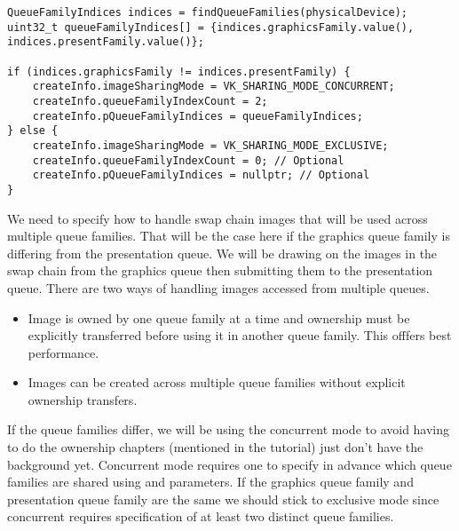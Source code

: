 \begin{center}
\begin{minipage}{0.95\linewidth}
\begin{lstlisting}
QueueFamilyIndices indices = findQueueFamilies(physicalDevice);
uint32_t queueFamilyIndices[] = {indices.graphicsFamily.value(), indices.presentFamily.value()};

if (indices.graphicsFamily != indices.presentFamily) {
    createInfo.imageSharingMode = VK_SHARING_MODE_CONCURRENT;
    createInfo.queueFamilyIndexCount = 2;
    createInfo.pQueueFamilyIndices = queueFamilyIndices;
} else {
    createInfo.imageSharingMode = VK_SHARING_MODE_EXCLUSIVE;
    createInfo.queueFamilyIndexCount = 0; // Optional
    createInfo.pQueueFamilyIndices = nullptr; // Optional
}
\end{lstlisting}
\end{minipage}
\end{center}

\par We need to specify how to handle swap chain images that will be used across multiple queue families. That will be the case here if the graphics queue family is differing from the presentation queue. We will be drawing on the images in the swap chain from the graphics queue then submitting them to the presentation queue. There are two ways of handling images accessed from multiple queues.

\begin{itemize}
    \item {} Image is owned by one queue family at a time and ownership must be explicitly transferred before using it in another queue family. This offfers best performance.
    \item {} Images can be created across multiple queue families without explicit ownership transfers.
\end{itemize}

\par If the queue families differ, we will be using the concurrent mode to avoid having to do the ownership chapters (mentioned in the tutorial) just don't have the background yet. Concurrent mode requires one to specify in advance which queue families are shared using  and  parameters. If the graphics queue family and presentation queue family are the same we should stick to exclusive mode since concurrent requires specification of at least two distinct queue families.

